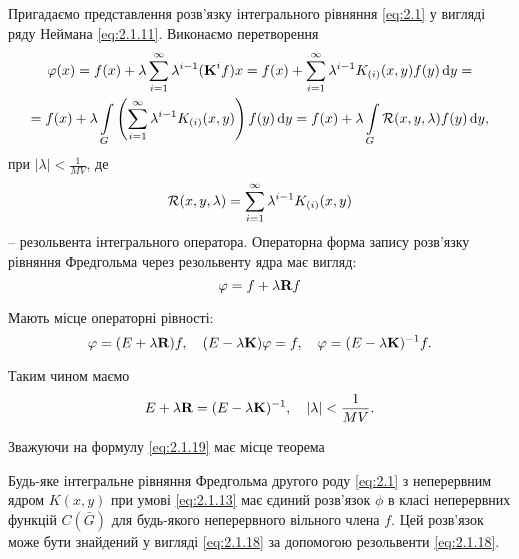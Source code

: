 Пригадаємо представлення розв’язку інтегрального рівняння \ref{eq:2.1} у вигляді ряду Неймана \eqref{eq:2.1.11}. Виконаємо перетворення
\begin{multline*}
	\varphi(x) = f(x) + \lambda \displaystyle\sum\limits_{i = 1}^\infty \lambda^{i - 1} (\textbf{K}^i f) x = f(x) + \displaystyle\sum\limits_{i = 1}^\infty \lambda^{i - 1} K_{(i)} (x, y) f(y) \mathop{}\!\mathrm{d} y = \\
	= f(x) + \lambda \displaystyle\int\limits_G \left( \displaystyle\sum\limits_{i = 1}^\infty \lambda^{i - 1} K_{(i)} (x, y) \right) f(y) \mathop{}\!\mathrm{d} y = f(x) + \lambda \displaystyle\int\limits_G \mathcal{R}(x, y, \lambda) f(y) \mathop{}\!\mathrm{d} y,
\end{multline*}
при $|\lambda| < \frac{1}{MV}$, де
\begin{equation}
	\label{eq:2.1.18}
	\mathcal{R}(x, y, \lambda) = \Sum_{i = 1}^\infty \lambda^{i - 1} K_{(i)} (x, y)
\end{equation}
-- резольвента інтегрального оператора. Операторна форма запису розв’язку рівняння Фредгольма через резольвенту ядра має вигляд:
\begin{equation}
	\label{eq:2.1.19}
	\phi = f + \lambda \bf{R} f
\end{equation}

Мають місце операторні рівності:
\begin{equation}
	\label{eq:2.1.20}
	\phi = (E + \lambda \bf{R})f, \quad (E - \lambda \bf{K})\phi = f,\quad \phi = (E - \lambda \bf{K})^{-1}f.
\end{equation}

Таким чином маємо
\begin{equation}
	\label{eq:2.1.21}
	E + \lambda \bf{R} = (E - \lambda \bf{K})^{-1}, \quad |\lambda| < \dfrac{1}{MV}.
\end{equation}

Зважуючи на формулу \eqref{eq:2.1.19} має місце теорема
\begin{theorem}
	Будь-яке інтегральне рівняння Фредгольма другого роду \eqref{eq:2.1} з неперервним ядром $K(x, y)$ при умові \eqref{eq:2.1.13} має єдиний розв’язок $\phi$ в класі неперервних функцій $C(\bar G)$ для будь-якого неперервного вільного члена $f$. Цей розв’язок може бути знайдений у вигляді \eqref{eq:2.1.18} за допомогою резольвенти \eqref{eq:2.1.18}.
\end{theorem}

